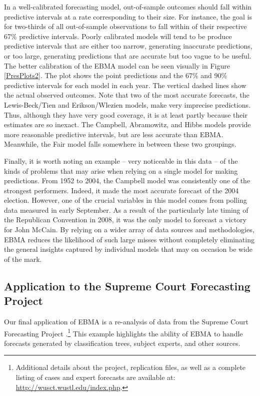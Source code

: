 \documentclass[12pt,fullpage]{article}
\newcommand{\note}[1]{\footnote{\doublespacing#1 \vspace{4 mm}}}
\begin{document}
 In a well-calibrated forecasting model, out-of-sample outcomes should
 fall within predictive intervals at a rate corresponding to their
 size.  For instance, the goal is for two-thirds of all out-of-sample
 observations to fall within of their respective 67\% predictive
 intervals.  Poorly calibrated models will tend to be produce
 predictive intervals that are either too narrow, generating
 inaccurate predictions, or too large, generating predictions that are
 accurate but too vague to be useful.  The better calibration of the
 EBMA model can be seen visually in Figure \ref{PresPlots2}.  The plot
 shows the point predictions and the 67\% and 90\% predictive
 intervals for each model in each year.  The vertical dashed lines
 show the actual observed outcomes.  Note that two of the most
 accurate forecasts, the Lewis-Beck/Tien and Erikson/Wlezien models,
 make very imprecise predictions.  Thus, although they have very good
 coverage, it is at least partly because their estimates are so
 inexact.  The Campbell, Abramowitz, and Hibbs models provide more
 reasonable predictive intervals, but are less accurate than
 EBMA. Meanwhile, the Fair model falls somewhere in between these two
 groupings.


 Finally, it is worth noting an example -- very noticeable in this
 data -- of the kinds of problems that may arise when relying on a
 single model for making predictions.  From 1952 to 2004, the Campbell
 model was consistently one of the strongest performers.  Indeed, it
 made the most accurate forecast of the 2004 election.  However, one
 of the crucial variables in this model comes from polling data
 measured in early September.  As a result of the particularly late
 timing of the Republican Convention in 2008, it was the only model to
 forecast a victory for John McCain.  By relying on a wider array of
 data sources and methodologies, EBMA reduces the likelihood of such
 large misses without completely eliminating the general insights
 captured by individual models that may on occasion be wide of the
 mark.


\subsection{Application to the Supreme Court Forecasting Project}

Our final application of EBMA is a re-analysis of data from the
Supreme Court Forecasting Project \citep{Ruger:2004,
  Martin:2004}.\note{Additional details about the project,
  replication files, as well as a complete listing of cases and expert
  forecasts are available at: \url{http://wusct.wustl.edu/index.php}.}
This example highlights the ability of EBMA to handle forecasts
generated by classification trees, subject experts, and other sources.
\end{document}
